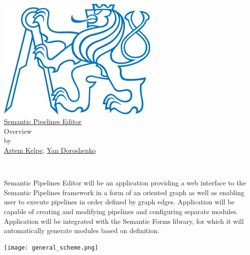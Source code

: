 \documentclass{article}
\begin{document}
\begin{center}
    \rule{0pt}{0pt}\\
    \vfill
    \includegraphics[scale=0.9]{logo.png}\\
    {\huge \href{https://gitlab.fel.cvut.cz/dorosyan/SPEd}{Semantic Pipelines Editor}\\}
    {\Large Overview\\}
    by\\
    {\large \href{mailto:kelpeart@fel.cvut.cz}{Artem Kelpe}, \href{mailto:dorosyan@fel.cvut.cz}{Yan Doroshenko}\\}
    \vfill
    \rule{0pt}{90pt}\\
\end{center}
\newpage
Semantic Pipelines Editor will be an application providing a web interface to the Semantic Pipelines framework in a form of an oriented graph as well as enabling user to execute pipelines in order defined by graph edges. Application will be capable of creating and modifying pipelines and configuring separate modules. Application will be integrated with the Semantic Forms library, for which it will automatically generate modules based on definition.\\
\begin{center}
    \texttt{[image: general\_scheme.png]}
\end{center}
\end{document}
